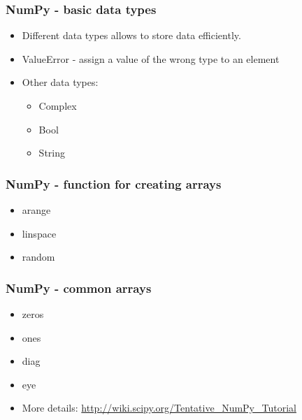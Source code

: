 \documentclass[11pt]{beamer}
\begin{document}
%
\begin{frame}[plain]
    \frametitle{NumPy - basic data types}
    \begin{itemize}
        \item[] Different data types allows to store data efficiently.
        \newline
         
         \item[] ValueError - assign a value of the wrong type to an element
         
         \item[] Other data types: 
        \begin{itemize}
            \item[] Complex 
            \item[] Bool 
            \item[] String
        \end{itemize}
        
    \end{itemize}
\end{frame}
%
\begin{frame}[plain]
    \frametitle{NumPy - function for creating arrays}
    \begin{itemize}
        \item[] arange
        
        \item[] linspace
        
        \item[] random
        
        
    \end{itemize}
\end{frame}
%
\begin{frame}[plain]
    \frametitle{NumPy - common arrays}
    \begin{itemize}
        \item[] zeros  
        
        \item[] ones 
        
        \item[] diag  
        
        \item[] eye   
        
        \item[] More details: \url{http://wiki.scipy.org/Tentative_NumPy_Tutorial}
    \end{itemize}
\end{frame}
\end{document}

